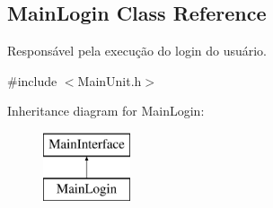 \hypertarget{classMainLogin}{\subsection{Main\-Login Class Reference}
\label{db/df3/classMainLogin}
}


Responsável pela execução do login do usuário.  




{\ttfamily \#include $<$Main\-Unit.\-h$>$}

Inheritance diagram for Main\-Login\-:\begin{figure}[H]
\begin{center}
\leavevmode
\includegraphics[height=2.000000cm]{db/df3/classMainLogin}
\end{center}
\end{figure}
